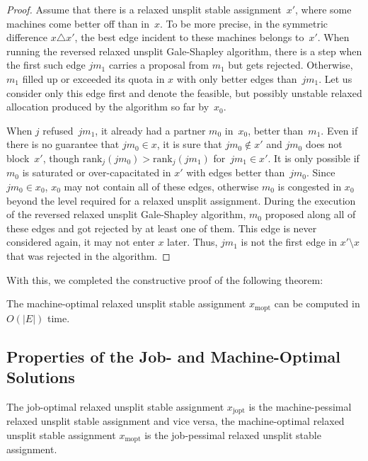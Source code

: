 \documentclass{llncs}
\begin{document}
\begin{proof}
Assume that there is a relaxed unsplit stable assignment~$x'$, where
some machines come better off than in~$x$. To be more precise, in the
symmetric difference $x \triangle x'$, the best edge incident to these
machines belongs to~$x'$. When running the reversed relaxed unsplit
Gale-Shapley algorithm, there is a step when the first such edge
$jm_1$ carries a proposal from $m_1$ but gets rejected. Otherwise,
$m_1$ filled up or exceeded its quota in $x$ with only better edges
than~$jm_1$. Let us consider only this edge first and denote the
feasible, but possibly unstable relaxed allocation produced by the
algorithm so far by~$x_0$.

When $j$ refused~$jm_1$, it already had a partner $m_0$ in~$x_0$,
better than~$m_1$. Even if there is no guarantee that $jm_0 \in x$, it
is sure that $jm_0 \notin x'$ and $jm_0$ does not block~$x'$, though
$\text{rank}_j(jm_0) > \text{rank}_j(jm_1)$ for~$jm_1 \in x'$. It is
only possible if $m_0$ is saturated or over-capacitated in $x'$ with
edges better than~$jm_0$. Since $jm_0 \in x_0$, $x_0$ may not contain
all of these edges, otherwise $m_0$ is congested in $x_0$ beyond the
level required for a relaxed unsplit assignment. During the execution
of the reversed relaxed unsplit Gale-Shapley algorithm, $m_0$ proposed
along all of these edges and got rejected by at least one of
them. This edge is never considered again, it may not enter $x$
later. Thus, $jm_1$ is not the first edge in $x' \setminus x$ that was
rejected in the algorithm.
\end{proof}

With this, we completed the constructive proof of the following theorem:

\begin{theorem}
\label{m_opt}
The machine-optimal relaxed unsplit stable assignment
$x_{\text{mopt}}$ can be computed in $O(|E|)$ time.
\end{theorem}

\subsection{Properties of the Job- and Machine-Optimal Solutions}

\begin{theorem}
\label{th:opt_pess}
The job-optimal relaxed unsplit stable assignment $x_{\text{jopt}}$ is
the machine-pessimal relaxed unsplit stable assignment and vice versa,
the machine-optimal relaxed unsplit stable assignment
$x_{\text{mopt}}$ is the job-pessimal relaxed unsplit stable
assignment.
\end{theorem}
\end{document}
